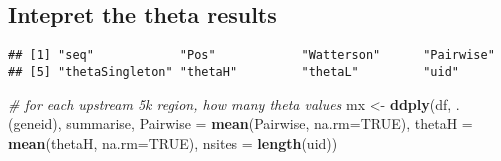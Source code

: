 \documentclass[]{article}
\newenvironment{Shaded}{\begin{snugshade}}{\end{snugshade}}
\newcommand{\CommentTok}[1]{\textcolor[rgb]{0.56,0.35,0.01}{\textit{#1}}}
\newcommand{\DataTypeTok}[1]{\textcolor[rgb]{0.13,0.29,0.53}{#1}}
\newcommand{\DecValTok}[1]{\textcolor[rgb]{0.00,0.00,0.81}{#1}}
\newcommand{\KeywordTok}[1]{\textcolor[rgb]{0.13,0.29,0.53}{\textbf{#1}}}
\newcommand{\NormalTok}[1]{#1}
\newcommand{\OperatorTok}[1]{\textcolor[rgb]{0.81,0.36,0.00}{\textbf{#1}}}
\newcommand{\OtherTok}[1]{\textcolor[rgb]{0.56,0.35,0.01}{#1}}
\newcommand{\StringTok}[1]{\textcolor[rgb]{0.31,0.60,0.02}{#1}}
\begin{document}
\hypertarget{intepret-the-theta-results-1}{%
\subsection{Intepret the theta
results}\label{intepret-the-theta-results-1}}

\begin{Shaded}
\end{Shaded}

\begin{verbatim}
## [1] "seq"            "Pos"            "Watterson"      "Pairwise"      
## [5] "thetaSingleton" "thetaH"         "thetaL"         "uid"
\end{verbatim}

\begin{Shaded}
\begin{Highlighting}[]
\CommentTok{# for each upstream 5k region, how many theta values}
\NormalTok{mx <-}\StringTok{ }\KeywordTok{ddply}\NormalTok{(df, .(geneid), summarise,}
            \DataTypeTok{Pairwise =} \KeywordTok{mean}\NormalTok{(Pairwise, }\DataTypeTok{na.rm=}\OtherTok{TRUE}\NormalTok{),}
            \DataTypeTok{thetaH =} \KeywordTok{mean}\NormalTok{(thetaH, }\DataTypeTok{na.rm=}\OtherTok{TRUE}\NormalTok{),}
            \DataTypeTok{nsites =} \KeywordTok{length}\NormalTok{(uid))}
\end{Highlighting}
\end{Shaded}
\end{document}

